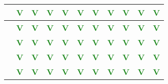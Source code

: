 \begin{frame}
{\begin{tabular}{|c||*{10}{c|}}
\hline
[283-344] & \textcolor{ForestGreen}{\textbf{V}} & \textcolor{ForestGreen}{\textbf{V}} & \textcolor{ForestGreen}{\textbf{V}} & \textcolor{ForestGreen}{\textbf{V}} & \textcolor{ForestGreen}{\textbf{V}} & \textcolor{ForestGreen}{\textbf{V}} & \textcolor{ForestGreen}{\textbf{V}} & \textcolor{ForestGreen}{\textbf{V}} & \textcolor{ForestGreen}{\textbf{V}} & \textcolor{ForestGreen}{\textbf{V}} \\
\hline
[344-443] & \textcolor{ForestGreen}{\textbf{V}} & \textcolor{ForestGreen}{\textbf{V}} & \textcolor{ForestGreen}{\textbf{V}} & \textcolor{ForestGreen}{\textbf{V}} & \textcolor{ForestGreen}{\textbf{V}} & \textcolor{ForestGreen}{\textbf{V}} & \textcolor{ForestGreen}{\textbf{V}} & \textcolor{ForestGreen}{\textbf{V}} & \textcolor{ForestGreen}{\textbf{V}} & \textcolor{ForestGreen}{\textbf{V}} \\
\hline
[443-577] & \textcolor{ForestGreen}{\textbf{V}} & \textcolor{ForestGreen}{\textbf{V}} & \textcolor{ForestGreen}{\textbf{V}} & \textcolor{ForestGreen}{\textbf{V}} & \textcolor{ForestGreen}{\textbf{V}} & \textcolor{ForestGreen}{\textbf{V}} & \textcolor{ForestGreen}{\textbf{V}} & \textcolor{ForestGreen}{\textbf{V}} & \textcolor{ForestGreen}{\textbf{V}} & \textcolor{ForestGreen}{\textbf{V}} \\
\hline
[577-606] & \textcolor{ForestGreen}{\textbf{V}} & \textcolor{ForestGreen}{\textbf{V}} & \textcolor{ForestGreen}{\textbf{V}} & \textcolor{ForestGreen}{\textbf{V}} & \textcolor{ForestGreen}{\textbf{V}} & \textcolor{ForestGreen}{\textbf{V}} & \textcolor{ForestGreen}{\textbf{V}} & \textcolor{ForestGreen}{\textbf{V}} & \textcolor{ForestGreen}{\textbf{V}} & \textcolor{ForestGreen}{\textbf{V}} \\
\hline
[606-1500] & \textcolor{ForestGreen}{\textbf{V}} & \textcolor{ForestGreen}{\textbf{V}} & \textcolor{ForestGreen}{\textbf{V}} & \textcolor{ForestGreen}{\textbf{V}} & \textcolor{ForestGreen}{\textbf{V}} & \textcolor{ForestGreen}{\textbf{V}} & \textcolor{ForestGreen}{\textbf{V}} & \textcolor{ForestGreen}{\textbf{V}} & \textcolor{ForestGreen}{\textbf{V}} & \textcolor{ForestGreen}{\textbf{V}} \\
\hline
\end{tabular}
}
\vspace{0.5cm}


\end{frame}
